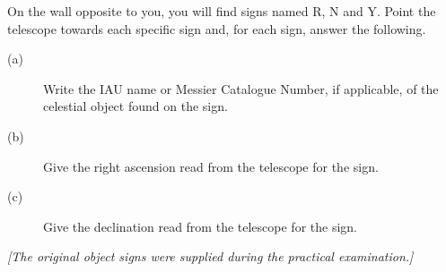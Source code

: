 On the wall opposite to you, you will find signs named R, N and Y. Point the telescope towards each specific sign and, for each sign, answer the following.
\begin{description}
\item[(a)] Write the IAU name or Messier Catalogue Number, if applicable, of the celestial object found on the sign.
\item[(b)] Give the right ascension read from the telescope for the sign.
\item[(c)] Give the declination read from the telescope for the sign.
\end{description}
\textit{[The original object signs were supplied during the practical examination.]}
